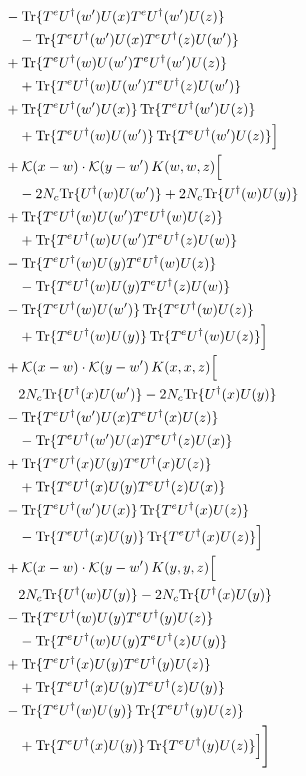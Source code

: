 \begin{align}
&-{\rm Tr}\{T^eU^\dagger(w')U(x)T^eU^\dagger(w')U(z)\}\notag\\
&\quad-{\rm Tr}\{T^eU^\dagger(w')U(x)T^eU^\dagger(z)U(w')\}\notag\\
&+{\rm Tr}\{T^eU^\dagger(w)U(w')T^eU^\dagger(w')U(z)\}\notag\\
&\quad+{\rm Tr}\{T^eU^\dagger(w)U(w')T^eU^\dagger(z)U(w')\}\notag\\
&+{\rm Tr}\{T^eU^\dagger(w')U(x)\}\,{\rm Tr}\{T^eU^\dagger(w')U(z)\}\notag\\
&\quad+{\rm Tr}\{T^eU^\dagger(w)U(w')\}\,{\rm Tr}\{T^eU^\dagger(w')U(z)\}\Big]\notag\\
&+\mathcal K(x-w)\cdot\mathcal K(y-w')\,K(w,w,z)\Big[\notag\\
&\quad-2 N_{c}{\rm Tr}\{U^\dagger(w)U(w')\}+2 N_{c}{\rm Tr}\{U^\dagger(w)U(y)\}\notag\\
&+{\rm Tr}\{T^eU^\dagger(w)U(w')T^eU^\dagger(w)U(z)\}\notag\\
&\quad+{\rm Tr}\{T^eU^\dagger(w)U(w')T^eU^\dagger(z)U(w)\}\notag\\
&-{\rm Tr}\{T^eU^\dagger(w)U(y)T^eU^\dagger(w)U(z)\}\notag\\
&\quad-{\rm Tr}\{T^eU^\dagger(w)U(y)T^eU^\dagger(z)U(w)\}\notag\\
&-{\rm Tr}\{T^eU^\dagger(w)U(w')\}\,{\rm Tr}\{T^eU^\dagger(w)U(z)\}\notag\\
&\quad+{\rm Tr}\{T^eU^\dagger(w)U(y)\}\,{\rm Tr}\{T^eU^\dagger(w)U(z)\}\Big]\notag\\
&+\mathcal K(x-w)\cdot\mathcal K(y-w')\,K(x,x,z)\Big[\notag\\
&\quad2 N_{c}{\rm Tr}\{U^\dagger(x)U(w')\}-2 N_{c}{\rm Tr}\{U^\dagger(x)U(y)\}\notag\\
&-{\rm Tr}\{T^eU^\dagger(w')U(x)T^eU^\dagger(x)U(z)\}\notag\\
&\quad-{\rm Tr}\{T^eU^\dagger(w')U(x)T^eU^\dagger(z)U(x)\}\notag\\
&+{\rm Tr}\{T^eU^\dagger(x)U(y)T^eU^\dagger(x)U(z)\}\notag\\
&\quad+{\rm Tr}\{T^eU^\dagger(x)U(y)T^eU^\dagger(z)U(x)\}\notag\\
&-{\rm Tr}\{T^eU^\dagger(w')U(x)\}\,{\rm Tr}\{T^eU^\dagger(x)U(z)\}\notag\\
&\quad-{\rm Tr}\{T^eU^\dagger(x)U(y)\}\,{\rm Tr}\{T^eU^\dagger(x)U(z)\}\Big]\notag\\
&+\mathcal K(x-w)\cdot\mathcal K(y-w')\,K(y,y,z)\Big[\notag\\
&\quad2 N_{c}{\rm Tr}\{U^\dagger(w)U(y)\}-2 N_{c}{\rm Tr}\{U^\dagger(x)U(y)\}\notag\\
&-{\rm Tr}\{T^eU^\dagger(w)U(y)T^eU^\dagger(y)U(z)\}\notag\\
&\quad-{\rm Tr}\{T^eU^\dagger(w)U(y)T^eU^\dagger(z)U(y)\}\notag\\
&+{\rm Tr}\{T^eU^\dagger(x)U(y)T^eU^\dagger(y)U(z)\}\notag\\
&\quad+{\rm Tr}\{T^eU^\dagger(x)U(y)T^eU^\dagger(z)U(y)\}\notag\\
&-{\rm Tr}\{T^eU^\dagger(w)U(y)\}\,{\rm Tr}\{T^eU^\dagger(y)U(z)\}\notag\\
&\quad+{\rm Tr}\{T^eU^\dagger(x)U(y)\}\,{\rm Tr}\{T^eU^\dagger(y)U(z)\}\Big]\Bigg]
\end{align} 
